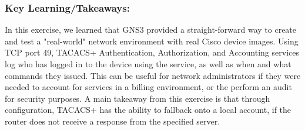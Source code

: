 \documentclass[main.tex]{subfiles}
\begin{document}


\subsubsection{Key Learning/Takeaways: }

In this exercise, we learned that GNS3 provided a straight-forward way to create and test a "real-world" network environment with real Cisco device images. Using TCP port 49, TACACS+ Authentication, Authorization, and Accounting services log who has logged in to the device using the service, as well as when and what commands they issued. This can be useful for network administrators if they were needed to account for services in a billing environment, or the perform an audit for security purposes. A main takeaway from this exercise is that through configuration, TACACS+ has the ability to fallback onto a local account, if the router does not receive a response from the specified server.
\end{document}
